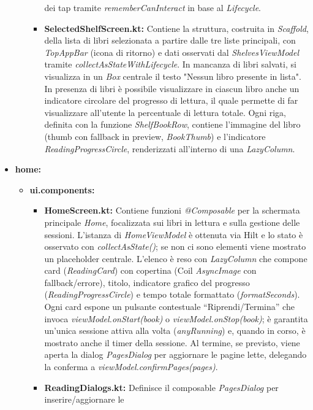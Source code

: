 \documentclass{article}
\begin{document}
\begin{itemize}
\begin{itemize}
\begin{itemize}
      dei tap tramite \textit{rememberCanInteract} in base al \textit{Lifecycle}.
      \item \textbf{SelectedShelfScreen.kt:} Contiene la struttura, costruita in \textit{Scaffold}, della lista di libri selezionata a partire dalle tre liste principali, con \textit{TopAppBar} (icona di ritorno) e dati osservati dal \textit{ShelvesViewModel} 
      tramite \textit{collectAsStateWithLifecycle}. In mancanza di libri salvati, si visualizza in un \textit{Box} centrale il testo "Nessun libro presente in lista". In presenza di libri è possibile visualizzare in ciascun libro anche un indicatore circolare 
      del progresso di lettura, il quale permette di far visualizzare all'utente la percentuale di lettura totale. Ogni riga, definita con la funzione \textit{ShelfBookRow}, contiene l'immagine del libro (thumb con fallback in preview, \textit{BookThumb}) 
      e l’indicatore \textit{ReadingProgressCircle}, renderizzati all’interno di una \textit{LazyColumn}.
    \end{itemize}
  \end{itemize}
  \item \textbf{home:}
  \begin{itemize}
    \item \textbf{ui.components:}
    \begin{itemize}
      \item \textbf{HomeScreen.kt:} Contiene funzioni \textit{@Composable} per la schermata principale \emph{Home}, focalizzata sui libri in lettura e sulla gestione delle sessioni. 
      L’istanza di \textit{HomeViewModel} è ottenuta via Hilt e lo stato è osservato con \textit{collectAsState()}; se non ci sono elementi viene mostrato un placeholder centrale. L’elenco è reso con \textit{LazyColumn} che compone card 
      (\textit{ReadingCard}) con copertina (Coil \textit{AsyncImage} con fallback/errore), titolo, indicatore grafico del progresso (\textit{ReadingProgressCircle}) e tempo totale formattato (\textit{formatSeconds}). Ogni card espone un pulsante contestuale “Riprendi/Termina” che invoca \textit{viewModel.onStart(book)} o \textit{viewModel.onStop(book)}; 
      è garantita un’unica sessione attiva alla volta (\textit{anyRunning}) e, quando in corso, è mostrato anche il timer della sessione. Al termine, se previsto, viene aperta la dialog \textit{PagesDialog} per aggiornare le pagine lette, delegando la conferma a \textit{viewModel.confirmPages(pages)}.
      \item \textbf{ReadingDialogs.kt:} Definisce il composable \textit{PagesDialog} per inserire/aggiornare le 

\end{itemize}
\end{itemize}
\end{itemize}
\end{document}
